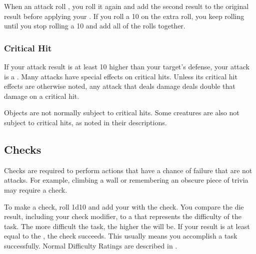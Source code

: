             When an attack roll , you roll it again and add the second result to the original result before applying your .
            If you roll a 10 on the extra roll, you keep rolling until you stop rolling a 10 and add all of the rolls together.

        \subsubsection{Critical Hit}\label{Critical Hit}
            If your attack result is at least 10 higher than your target's defense, your attack is a .
            Many attacks have special effects on critical hits.
            Unless its critical hit effects are otherwise noted, any attack that deals damage deals double that damage on a critical hit.

            Objects are not normally subject to critical hits.
            Some creatures are also not subject to critical hits, as noted in their descriptions.

    \subsection{Checks}\label{Checks}
        Checks are required to perform actions that have a chance of failure that are not attacks.
        For example, climbing a wall or remembering an obscure piece of trivia may require a check.

        To make a check, roll 1d10 and add your  with the check.
        You compare the die result, including your check modifier, to a  that represents the difficulty of the task.
        The more difficult the task, the higher the  will be.
        If your result is at least equal to the , the check succeeds.
        This usually means you accomplish a task successfully.
        Normal Difficulty Ratings are described in .

